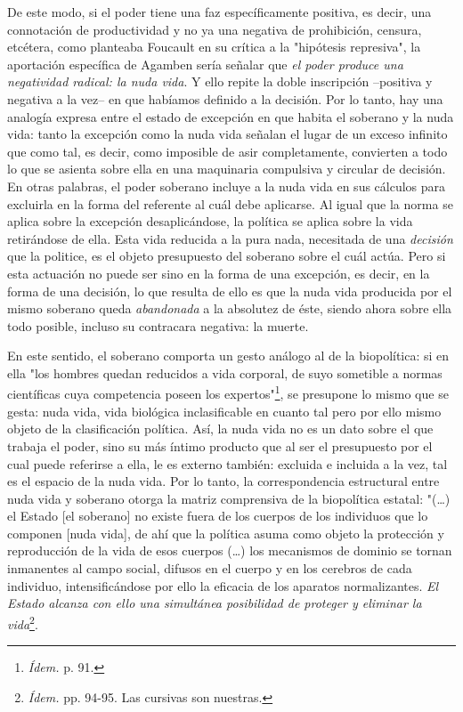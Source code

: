 De este modo, si el poder tiene una faz específicamente positiva, es
decir, una connotación de productividad y no ya una negativa de
prohibición, censura, etcétera, como planteaba Foucault en su crítica a
la "hipótesis represiva", la aportación específica de Agamben sería
señalar que \emph{el poder produce una negatividad radical: la nuda
vida}. Y ello repite la doble inscripción --positiva y negativa a la
vez-- en que habíamos definido a la decisión. Por lo tanto, hay una
analogía expresa entre el estado de excepción en que habita el soberano
y la nuda vida: tanto la excepción como la nuda vida señalan el lugar de
un exceso infinito que como tal, es decir, como imposible de asir
completamente, convierten a todo lo que se asienta sobre ella en una
maquinaria compulsiva y circular de decisión. En otras palabras, el
poder soberano incluye a la nuda vida en sus cálculos para excluirla en
la forma del referente al cuál debe aplicarse. Al igual que la norma se
aplica sobre la excepción desaplicándose, la política se aplica sobre la
vida retirándose de ella. Esta vida reducida a la pura nada, necesitada
de una \emph{decisión} que la politice, es el objeto presupuesto del
soberano sobre el cuál actúa. Pero si esta actuación no puede ser sino
en la forma de una excepción, es decir, en la forma de una decisión, lo
que resulta de ello es que la nuda vida producida por el mismo soberano
queda \emph{abandonada} a la absolutez de éste, siendo ahora sobre ella
todo posible, incluso su contracara negativa: la muerte.

En este sentido, el soberano comporta un gesto análogo al de la
biopolítica: si en ella "los hombres quedan reducidos a vida corporal,
de suyo sometible a normas científicas cuya competencia poseen los
expertos"\footnote{\emph{Ídem.} p. 91.}, se presupone lo mismo que se
gesta: nuda vida, vida biológica inclasificable en cuanto tal pero por
ello mismo objeto de la clasificación política. Así, la nuda vida no es
un dato sobre el que trabaja el poder, sino su más íntimo producto que
al ser el presupuesto por el cual puede referirse a ella, le es externo
también: excluida e incluida a la vez, tal es el espacio de la nuda
vida. Por lo tanto, la correspondencia estructural entre nuda vida y
soberano otorga la matriz comprensiva de la biopolítica estatal:
"(\dots) el Estado {[}el soberano{]} no existe fuera de los cuerpos
de los individuos que lo componen {[}nuda vida{]}, de ahí que la
política asuma como objeto la protección y reproducción de la vida de
esos cuerpos (\dots) los mecanismos de dominio se tornan inmanentes
al campo social, difusos en el cuerpo y en los cerebros de cada
individuo, intensificándose por ello la eficacia de los aparatos
normalizantes. \emph{El Estado alcanza con ello una simultánea
posibilidad de proteger y eliminar la vida}\footnote{\emph{Ídem.} pp.
  94-95. Las cursivas son nuestras.}.


